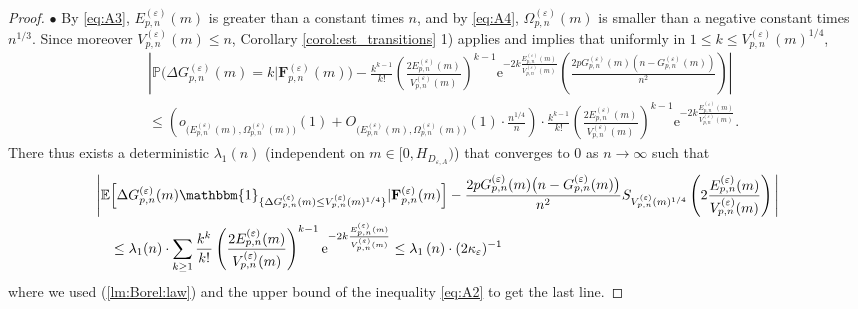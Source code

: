 \documentclass[a4, 11pt]{article}
\numberwithin{equation}{section}
\theoremstyle{plain}
\theoremstyle{definition}
\theoremstyle{remark}
\begin{document}
\begin{proof}
	\hspace{0.5cm} $\bullet$ By \eqref{eq:A3}, $E_{p,n}^{(\varepsilon)}(m)$ is greater than a constant times $n$, and by \eqref{eq:A4}, $\Omega_{p,n}^{(\varepsilon)}(m)$ is smaller than a negative constant times $n^{1/3}$. Since moreover $V_{p,n}^{(\varepsilon)}(m)\leq n$, Corollary \ref{corol:est_transitions} 1) applies and implies that uniformly in $1 \leq k \leq V_{p,n}^{(\varepsilon)}(m)^{1/4}$,
	\begin{align*}
		& \left\vert \mathbb{P}\big(\Delta G_{p,n}^{(\varepsilon)}(m)=k | {\mathbf{F}}^{(\varepsilon)}_{p,n}(m)\big)-\frac{k^{k-1}}{k!}\left(\frac{2E_{p,n}^{(\varepsilon)}(m)}{V_{p,n}^{(\varepsilon)}(m)}\right)^{k-1}\mathrm{e}^{-2k\frac{E_{p,n}^{(\varepsilon)}(m)}{V_{p,n}^{(\varepsilon)}(m)}}\left(\frac{2pG_{p,n}^{(\varepsilon)}(m)\left(n-G_{p,n}^{(\varepsilon)}(m)\right)}{n^2}\right)\right\vert  \\
		&\leq \left(o_{\big(E_{p,n}^{(\varepsilon)}(m),\Omega_{p,n}^{(\varepsilon)}(m)\big)}(1)+O_{\big(E_{p,n}^{(\varepsilon)}(m),\Omega_{p,n}^{(\varepsilon)}(m)\big)}(1) \cdot \frac{n^{1/4}}{n}\right) \cdot \frac{k^{k-1}}{k!}\left(\frac{2E_{p,n}^{(\varepsilon)}(m)}{V_{p,n}^{(\varepsilon)}(m)}\right)^{k-1}\mathrm{e}^{-2k\frac{E_{p,n}^{(\varepsilon)}(m)}{V_{p,n}^{(\varepsilon)}(m)}}.
	\end{align*}
	There thus exists a deterministic $\lambda_1(n)$ (independent on $m \in \big[0,H_{D_{\varepsilon,A}}\big)$) that converges to 0 as $n \rightarrow \infty$ such that	
	\begin{align*}
		\Bigg\vert \mathbb{E}&\Big[\Delta G_{p,n}^{(\varepsilon)}(m)\mathbbm{1}_{\{\Delta G_{p,n}^{(\varepsilon)}(m)\leq V_{p,n}^{(\varepsilon)}(m)^{1/4}\}} | {\mathbf{F}}^{(\varepsilon)}_{p,n}(m)  \Big]-\frac{2p G_{p,n}^{(\varepsilon)}(m)\big(n-G_{p,n}^{(\varepsilon)}(m)\big)}{n^2}S_{V_{p,n}^{(\varepsilon)}(m)^{1/4}}\left(2\frac{E_{p,n}^{(\varepsilon)}(m)}{V_{p,n}^{(\varepsilon)}(m)}\right) \Bigg\vert\\
		&\leq \lambda_1(n) \cdot \sum_{k\geq 1}\frac{k^{k}}{k!}\left(\frac{2E_{p,n}^{(\varepsilon)}(m)}{V_{p,n}^{(\varepsilon)}(m)}\right)^{k-1}\mathrm{e}^{-2k\frac{E_{p,n}^{(\varepsilon)}(m)}{V_{p,n}^{(\varepsilon)}(m)}} \leq \lambda_1\left(n\right) \cdot (2\kappa_{\varepsilon})^{-1}
	\end{align*}
	where we used (\ref{lm:Borel:law}) and the upper bound of the inequality \eqref{eq:A2} to get the last line. 
		

\end{proof}
\end{document}
